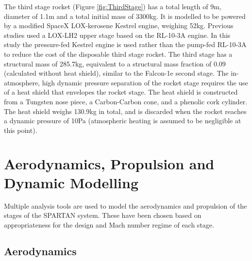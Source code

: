 \documentclass[journal]{new-aiaa}
\begin{document}
The third stage rocket (Figure \ref{fig:ThirdStage}) has a total length of 9m, diameter of 1.1m and a total initial mass of 3300kg. It is modelled to be powered by a modified SpaceX LOX-kerosene Kestrel engine\cite{Vehicle2008}, weighing 52kg. Previous studies used a LOX-LH2 upper stage based on the RL-10-3A engine\cite{Preller2017b}. In this study the pressure-fed Kestrel engine is used rather than the pump-fed RL-10-3A to reduce the cost of the disposable third stage rocket. The third stage has a structural mass of 285.7kg, equivalent to a structural mass fraction of 0.09 (calculated without heat shield), similar to the Falcon-1e second stage\cite{Vehicle2008}. The in-atmosphere, high dynamic pressure separation of the rocket stage requires the use of a heat shield that envelopes the rocket stage. The heat shield is constructed from a Tungsten nose piece, a Carbon-Carbon cone, and a phenolic cork cylinder. The heat shield weighs 130.9kg in total, and is discarded when the rocket reaches a dynamic pressure of 10Pa (atmospheric heating is assumed to be negligible at this point)\cite{Preller2015a,Preller2017b}. 


\section{Aerodynamics, Propulsion and Dynamic Modelling}\label{section:aero}

Multiple analysis tools are used to model the aerodynamics and propulsion of the stages of the SPARTAN system. These have been chosen based on appropriateness for the design and Mach number regime of each stage. 

\subsection{Aerodynamics}
\end{document}
